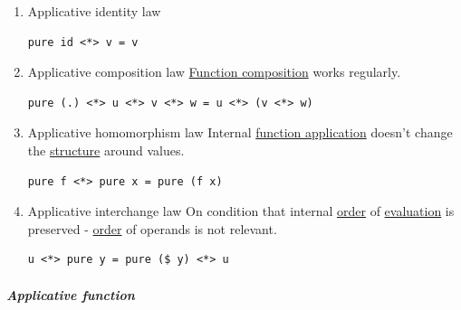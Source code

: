 \documentclass[11pt]{article}
\begin{document}
\begin{enumerate}
\item \label{org419d879}Applicative identity law
\label{sec:orgeac1b07}
\begin{verbatim}
pure id <*> v = v
\end{verbatim}

\item \label{org90f138d}Applicative composition law
\label{sec:org273c69e}
\hyperref[org57b44d1]{Function composition} works regularly.\\
\begin{verbatim}
pure (.) <*> u <*> v <*> w = u <*> (v <*> w)
\end{verbatim}

\item \label{org69412a9}Applicative homomorphism law
\label{sec:org1a526c2}
Internal \hyperref[org6ff03b0]{function application} doesn't change the \hyperref[org93ee82c]{structure} around values.\\
\begin{verbatim}
pure f <*> pure x = pure (f x)
\end{verbatim}

\item \label{org342f3d5}Applicative interchange law
\label{sec:org2d5fe01}
On condition that internal \hyperref[org8544276]{order} of \hyperref[org5445907]{evaluation} is preserved - \hyperref[org8544276]{order} of operands is not relevant.\\
\begin{verbatim}
u <*> pure y = pure ($ y) <*> u
\end{verbatim}
\end{enumerate}

\subparagraph{\label{org5831e8a}Applicative function}
\label{sec:org2cc94b1}
\end{document}
